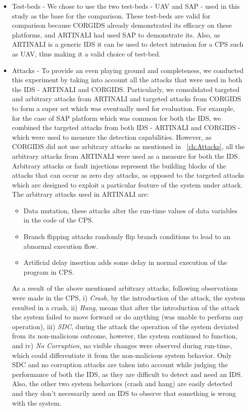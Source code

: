 \begin{itemize}
\item Test-beds - We chose to use the two test-beds - UAV and SAP - used in this study as the base for the comparison. These test-beds are valid for comparison because CORGIDS already demonstrated its efficacy on these platforms, and ARTINALI had used SAP to demonstrate its. Also, as ARTINALI is a generic IDS it can be used to detect intrusion for a CPS such as UAV, thus making it  a valid choice of test-bed.

\item Attacks - To provide an even playing ground and completeness, we conducted this experiment by taking into account all the attacks that were used in both the IDS - ARTINALI and CORGIDS. Particularly, we consolidated targeted and arbitrary attacks from ARTINALI and targeted attacks from CORGIDS to form a super set which was eventually used for evaluation. For example, for the case of SAP platform which was common for both the IDS, we combined the targeted attacks from both IDS - ARTINALI and CORGIDS - which were used to measure the detection capabilities. However, as CORGIDS did not use arbitrary attacks as mentioned in ~\autoref{ch:Attacks}, all the arbitrary attacks from ARTINALI were used as a measure for both the IDS.
Arbitrary attacks or fault injections represent the building blocks of the attacks that can occur as zero day attacks, as opposed to the targeted attacks which are designed to exploit a particular feature of the system under attack. The arbitrary attacks used in ARTINALI are:

\begin{itemize}
\item Data mutation, these attacks alter the run-time values of data variables in the code of the CPS.
\item Branch flipping attacks randomly flip branch conditions to lead to an abnormal execution flow.
\item Artificial delay insertion adds some delay in normal execution of the program in CPS.
\end{itemize}

As a result of the above mentioned arbitrary attacks, following observations were made in the CPS, i) \textit{Crash}, by the introduction of the attack, the system resulted in a crash, ii) \textit{Hang}, means that after the introduction of the attack the system failed to move forward or do anything (was unable to perform any operation), iii) \textit{\ac{SDC}}, during the attack the operation of the system deviated from its non-malicious outcome, however, the system continued to function, and iv) \textit{No Corruption}, no visible changes were observed during run-time, which could differentiate it from the non-malicious system behavior. Only \ac{SDC} and no corruption attacks are taken into account while judging the performance of both the IDS, as they are difficult to detect and need an IDS. Also, the other two system behaviors (crash and hang) are easily detected and they don't necessarily need an IDS to observe that something is wrong with the system. 


\end{itemize}
